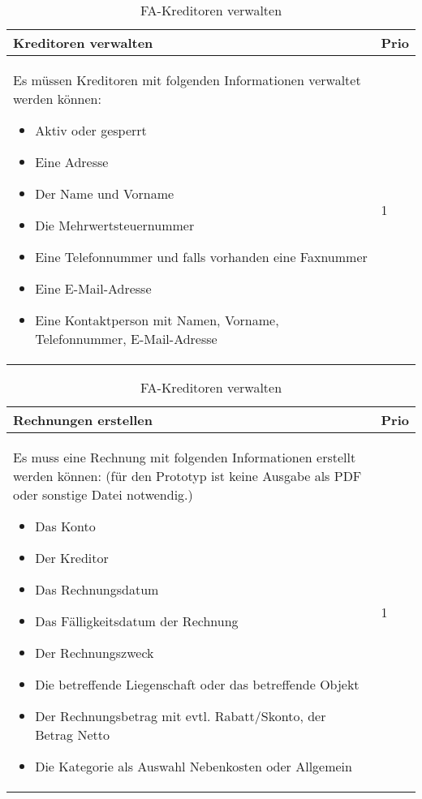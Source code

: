 \begin{table}[H]
  \centering
  \settowidth{}
  \setlength\extrarowheight{2pt}
  \begin{tabulary}{1.0\textwidth}{|m{16cm}|L|}
    \hline
    \textbf{Kreditoren verwalten}&\textbf{Prio}\\
    \hline
    Es müssen Kreditoren mit folgenden Informationen verwaltet werden können:
    \begin{itemize}
      \item Aktiv oder gesperrt
      \item Eine Adresse
      \item Der Name und Vorname
      \item Die Mehrwertsteuernummer
      \item Eine Telefonnummer und falls vorhanden eine Faxnummer
      \item Eine E-Mail-Adresse
      \item Eine Kontaktperson mit Namen, Vorname, Telefonnummer, E-Mail-Adresse
    \end{itemize} & 1\\
    \hline
  \end{tabulary}
  \caption{FA-Kreditoren verwalten}
  \label{faKreditorenVerwalten}
\end{table}

\begin{table}[H]
  \centering
  \settowidth{}
  \setlength\extrarowheight{2pt}
  \begin{tabulary}{1.0\textwidth}{|m{16cm}|L|}
    \hline
    \textbf{Rechnungen erstellen}&\textbf{Prio}\\
    \hline
    Es muss eine Rechnung mit folgenden Informationen erstellt werden können: (für den Prototyp ist keine Ausgabe als PDF oder sonstige Datei notwendig.)
    \begin{itemize}
      \item Das Konto
      \item Der Kreditor
      \item Das Rechnungsdatum
      \item Das Fälligkeitsdatum der Rechnung
      \item Der Rechnungszweck
      \item Die betreffende Liegenschaft oder das betreffende Objekt
      \item Der Rechnungsbetrag mit evtl. Rabatt/Skonto, der Betrag Netto
      \item Die Kategorie als Auswahl Nebenkosten oder Allgemein
    \end{itemize} & 1\\
    \hline
  \end{tabulary}
  \caption{FA-Kreditoren verwalten}
  \label{faRechnungenErstellen}
\end{table}

